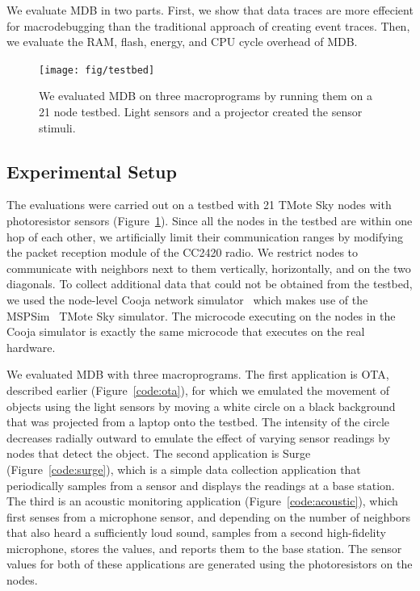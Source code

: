 We evaluate MDB in two parts. First, we show that data traces
are more effecient for macrodebugging than the traditional approach of creating
event traces.  Then, we evaluate the RAM, flash, energy, and CPU cycle overhead
of MDB\@.

\begin{figure}[t]
  \centering
  \texttt{[image: fig/testbed]}
  \caption[Evaluation testbed with 21 Tmote Sky motes]{We evaluated MDB on three
  macroprograms by running them on a 21 node testbed. Light sensors and a
  projector created the sensor stimuli.}
  \label{fig:testbed}
\end{figure}

\subsection{Experimental Setup}
The evaluations were carried out on a testbed with 21 TMote Sky nodes with
photoresistor sensors (Figure~\ref{fig:testbed}). Since all the nodes in the
testbed are within one hop of each other, we artificially limit their
communication ranges by modifying the packet reception module of the CC2420
radio. We restrict nodes to communicate with neighbors next to them vertically,
horizontally, and on the two diagonals.  To collect additional data that could
not be obtained from the testbed, we used the node-level Cooja network
simulator~\cite{Osterlind2006} which makes use of the MSPSim~\cite{Eriksson2007}
TMote Sky simulator.  The microcode executing on the nodes in the Cooja
simulator is exactly the same microcode that executes on the real \tmotesky
hardware.

We evaluated MDB with three macroprograms.  The first application is OTA,
described earlier (Figure~\ref{code:ota}), for which we emulated the movement of
objects using the light sensors by moving a white circle on a black background
that was projected from a laptop onto the testbed. The intensity of the circle
decreases radially outward to emulate the effect of varying sensor readings by
nodes that detect the object.  The second application is Surge
(Figure~\ref{code:surge}), which is a simple data collection application that
periodically samples from a sensor and displays the readings at a base station.
The third is an acoustic monitoring application (Figure~\ref{code:acoustic}),
which first senses from a microphone sensor, and depending on the number of
neighbors that also heard a sufficiently loud sound, samples from a second
high-fidelity microphone, stores the values, and reports them to
the base station.  The sensor values for both of these applications are
generated using the photoresistors on the nodes.

